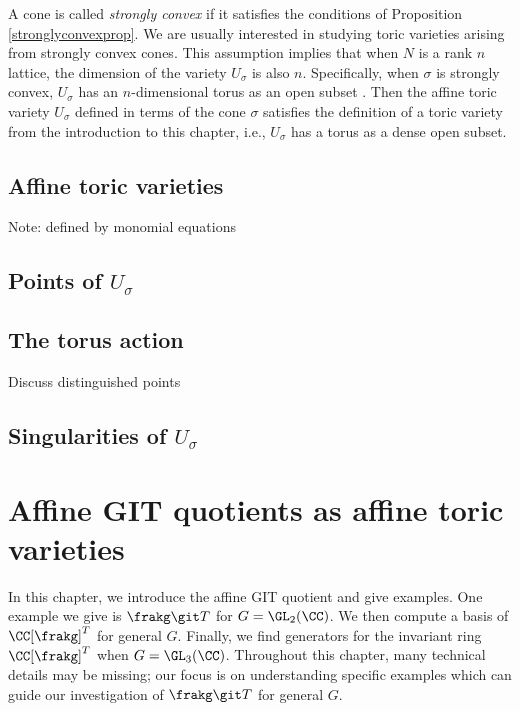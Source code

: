 \documentclass[12pt]{amsart}
\theoremstyle{plain}
\begin{document}
A cone is called \emph{strongly convex} if it satisfies the conditions of Proposition \ref{stronglyconvexprop}.
We are usually interested in studying toric varieties arising from strongly convex cones.
This assumption implies that when $N$ is a rank $n$ lattice, the dimension of the variety $U_\sigma$ is also $n$.
Specifically, when $\sigma$ is strongly convex, $U_\sigma$ has an $n$-dimensional torus as an open subset \cite[Theorem 1.2.18]{CLS11}.
Then the affine toric variety $U_\sigma$ defined in terms of the cone $\sigma$ satisfies the definition of a toric variety from the introduction to this chapter, i.e., $U_\sigma$ has a torus as a dense open subset.

\subsection{Affine toric varieties}

Note: defined by monomial equations


\subsection{Points of $U_\sigma$}



\subsection{The torus action}
Discuss distinguished points


\subsection{Singularities of $U_\sigma$}


\newpage
\section{Affine GIT quotients as affine toric varieties}
In this chapter, we introduce the affine GIT quotient and give examples.
One example we give is $\frakg \git T$ for $G = \GL_2(\CC)$.
We then compute a basis of $\CC[\frakg]^T$ for general $G$.
Finally, we find generators for the invariant ring $\CC[\frakg]^T$ when $G = \GL_3(\CC)$.
Throughout this chapter, many technical details may be missing;
our focus is on understanding specific examples which can guide our investigation of $\frakg \git T$ for general $G$.
\end{document}

